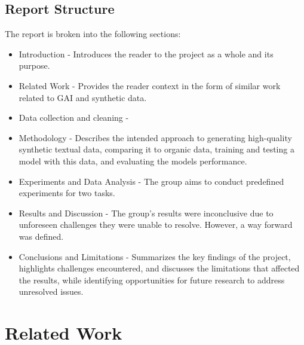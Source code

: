 \documentclass[sigplan,screen]{acmart}
\begin{document}
\subsection{Report Structure}
The report is broken into the following sections:
\begin{itemize}
    \item Introduction - Introduces the reader to the project as a whole and its purpose. 
    \item Related Work - Provides the reader context in the form of similar work related to GAI and synthetic data.
    \item Data collection and cleaning - 
    \item Methodology - Describes the intended approach to generating high-quality synthetic textual data, comparing it to organic data, training and testing a model with this data, and evaluating the models performance.
    \item Experiments and Data Analysis - The group aims to conduct predefined experiments for two tasks. 
    \item Results and Discussion - The group's results were inconclusive due to unforeseen challenges they were unable to resolve. However, a way forward was defined.
    \item Conclusions and Limitations - Summarizes the key findings of the project, highlights challenges encountered, and discusses the limitations that affected the results, while identifying opportunities for future research to address unresolved issues.

\end{itemize}

\section{Related Work}
\end{document}
